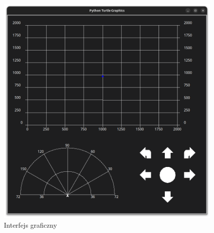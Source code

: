     \begin{figure}[!ht]
        \centering
        \includegraphics[height = 0.43\textheight]{Img/GUI.png}
        \caption{Interfejs graficzny}
    \end{figure}
        
    
    \newpage
